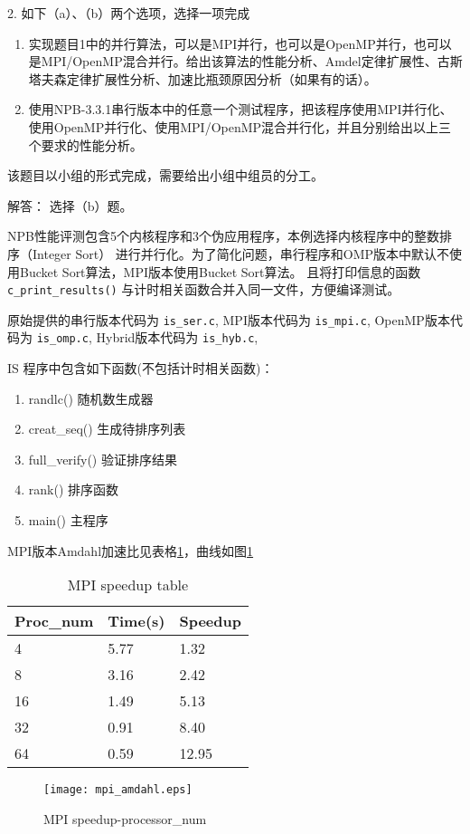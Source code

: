\documentclass{ctexart}
\begin{document}
2. 如下（a）、（b）两个选项，选择一项完成
\begin{enumerate}[label=(\alph*)]
    \item 实现题目1中的并行算法，可以是MPI并行，也可以是OpenMP并行，也可以是MPI/OpenMP混合并行。给出该算法的性能分析、Amdel定律扩展性、古斯塔夫森定律扩展性分析、加速比瓶颈原因分析（如果有的话）。
    \item 使用NPB-3.3.1串行版本中的任意一个测试程序，把该程序使用MPI并行化、使用OpenMP并行化、使用MPI/OpenMP混合并行化，并且分别给出以上三个要求的性能分析。
\end{enumerate}
该题目以小组的形式完成，需要给出小组中组员的分工。

{\heiti 解答：}
选择（b）题。

NPB性能评测包含5个内核程序和3个伪应用程序，本例选择内核程序中的整数排序（Integer Sort）
进行并行化。为了简化问题，串行程序和OMP版本中默认不使用Bucket Sort算法，MPI版本使用Bucket Sort算法。
且将打印信息的函数\lstinline{c_print_results()}
与计时相关函数合并入同一文件，方便编译测试。

原始提供的串行版本代码为 \lstinline{is_ser.c},
MPI版本代码为 \lstinline{is_mpi.c},
OpenMP版本代码为 \lstinline{is_omp.c},
Hybrid版本代码为 \lstinline{is_hyb.c},

IS 程序中包含如下函数(不包括计时相关函数)：
\begin{enumerate}
    \item randlc() 随机数生成器
    \item creat\_seq() 生成待排序列表
    \item full\_verify() 验证排序结果
    \item rank() 排序函数
    \item main() 主程序
\end{enumerate}

MPI版本Amdahl加速比见表格\ref{tab:mpi_a}，曲线如图\ref{fig:mpi_a}
\begin{table}[]
    \centering
    \caption{MPI speedup table} 
    \label{tab:mpi_a} 
    \begin{tabular}{@{}lll@{}}
        \toprule
        Proc\_num & Time(s) & Speedup \\ \midrule
        4         & 5.77    & 1.32    \\
        8         & 3.16    & 2.42    \\
        16        & 1.49    & 5.13    \\
        32        & 0.91    & 8.40    \\
        64        & 0.59    & 12.95   \\ \bottomrule
    \end{tabular}
\end{table}
\begin{figure}
    \centering 
    \texttt{[image: mpi\_amdahl.eps]} 
    \caption{MPI speedup-processor\_num} 
    \label{fig:mpi_a} 
\end{figure}
\end{document}
